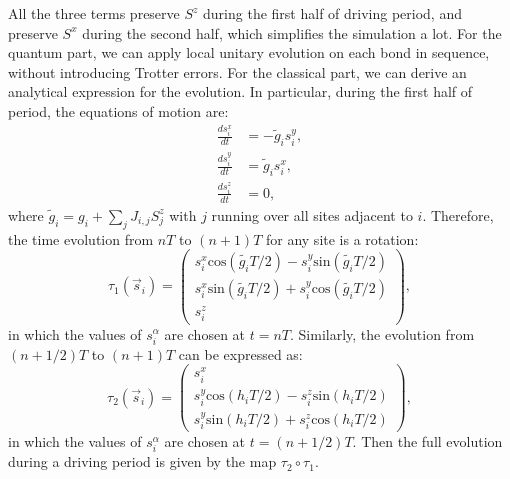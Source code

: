 \documentclass[onecolumn,superscriptaddress,notitlepage]{revtex4}
\begin{document}
All the three terms preserve $S^z$ during the first half of driving period, and preserve $S^x$ during the second half, which simplifies the simulation a lot. 
For the quantum part, we can apply local unitary evolution on each bond in sequence, without introducing Trotter errors. 
For the classical part, we can derive an analytical expression for the evolution. 
In particular, during the first half of period, the equations of motion are:
\begin{equation}
\begin{split}
\frac{ds^x_i}{dt} &= -\tilde{g}_i s^y_i, \\
\frac{ds^y_i}{dt} &= \tilde{g}_i s^x_i, \\
\frac{ds^z_i}{dt} &= 0, 
\end{split}
\end{equation}
where $\tilde{g}_i = g_i+\sum_{j} J_{i,j} S^z_j$ with $j$ running over all sites adjacent to $i$. 
Therefore, the time evolution from $nT$ to $(n+1)T$ for any site is a rotation:
\begin{equation}
\tau_1(\vec{s}_i)=
\begin{pmatrix}
s^x_i \mathrm{cos}(\tilde{g_i}T/2)-s^y_i \mathrm{sin}(\tilde{g_i}T/2)\\
s^x_i \mathrm{sin}(\tilde{g_i}T/2)+s^y_i \mathrm{cos}(\tilde{g_i}T/2)\\
s^z_i
\end{pmatrix},
\end{equation}
in which the values of $s^\alpha_i$ are chosen at $t=nT$. 
Similarly, the evolution from $(n+1/2)T$ to $(n+1)T$ can be expressed as:
\begin{equation}
\tau_2(\vec{s}_i)=
\begin{pmatrix}
s^x_i\\
s^y_i \mathrm{cos}(h_i T/2)-s^z_i \mathrm{sin}(h_i T/2)\\
s^y_i \mathrm{sin}(h_i T/2)+s^z_i \mathrm{cos}(h_i  T/2)
\end{pmatrix},
\end{equation}
in which the values of $s^\alpha_i$ are chosen at $t=(n+1/2)T$. 
Then the full evolution during a driving period is given by the map $\tau_2 \circ \tau_1$.
\end{document}

